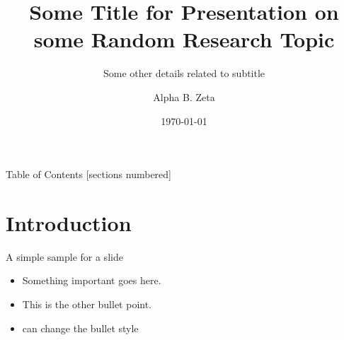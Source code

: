 \documentclass[10pt,xcolor=table]{beamer}
\title[A shorter title]{Some Title for Presentation on some Random Research Topic}
\subtitle[test]{Some other details related to subtitle}
\date{\today}
\author[alphazeta@bu.edu]{Alpha B. Zeta}
\institute[SPTL, BU]{Center for Space Physics, Boston University}
\begin{document}
{
\maketitle
}

%


\begin{frame}[plain]{Table of Contents}
  [sections numbered]
  \tableofcontents[currentsubsection,sectionstyle=show,subsectionstyle=show/shaded]
\end{frame}

\section[Intro]{Introduction}
    \begin{frame}{A simple sample for a slide}
        \begin{itemize}
            \item Something important goes here.
            \item This is the other bullet point.
            \item can change the bullet style
        \end{itemize}
    \end{frame}
    
\end{document}
